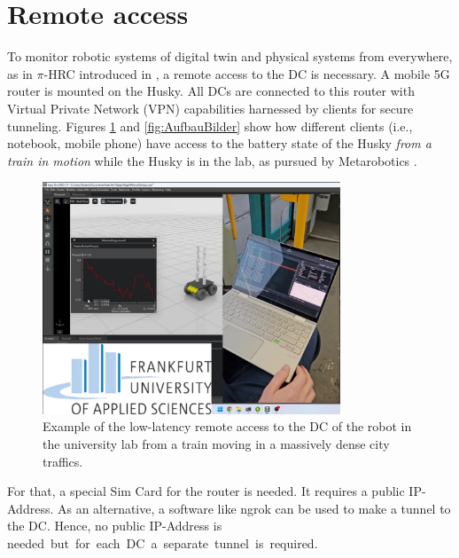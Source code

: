 \documentclass[conference]{IEEEtran}
\begin{document}
\section{Remote access}
 To monitor  robotic systems of digital twin and physical systems from everywhere, as in $\pi$-HRC introduced in \cite{kaigom2023metarobotics}, a remote access to the DC is necessary.
A mobile 5G router is mounted on the Husky. All DCs are connected to this router with Virtual Private Network (VPN) capabilities harnessed by  clients for secure tunneling. 
Figures \ref{fig:RemoteAccess} and \ref{fig:AufbauBilder} show how different clients (i.e., notebook, mobile phone) have access to the battery state of the Husky \textit{from a train in motion} while the Husky is in the lab, as pursued by Metarobotics \cite{kaigom2023metarobotics}.
\begin{figure}[htbp]
    \centerline{\includegraphics[width=8.9cm]{Pictures/ZugZugriff.png}}
    \caption{Example of the low-latency remote access to the DC of the robot in the university lab from a train moving in a massively dense city traffics.}
    \label{fig:RemoteAccess}
\end{figure}
For that, a special Sim Card for the router is needed.
It requires a public IP-Address. %
As an alternative, a software like ngrok can be used  to make a tunnel to the DC. Hence, no public IP-Address is \mbox{needed but for each DC a separate tunnel is required.}
\end{document}
